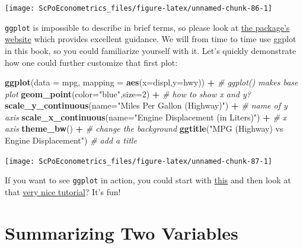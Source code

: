\documentclass[]{book}
\newenvironment{Shaded}{\begin{snugshade}}{\end{snugshade}}
\newcommand{\CommentTok}[1]{\textcolor[rgb]{0.56,0.35,0.01}{\textit{#1}}}
\newcommand{\DataTypeTok}[1]{\textcolor[rgb]{0.13,0.29,0.53}{#1}}
\newcommand{\DecValTok}[1]{\textcolor[rgb]{0.00,0.00,0.81}{#1}}
\newcommand{\KeywordTok}[1]{\textcolor[rgb]{0.13,0.29,0.53}{\textbf{#1}}}
\newcommand{\NormalTok}[1]{#1}
\newcommand{\OperatorTok}[1]{\textcolor[rgb]{0.81,0.36,0.00}{\textbf{#1}}}
\newcommand{\StringTok}[1]{\textcolor[rgb]{0.31,0.60,0.02}{#1}}
\begin{document}
\begin{center}\texttt{[image: ScPoEconometrics\_files/figure-latex/unnamed-chunk-86-1]} \end{center}

\texttt{ggplot} is impossible to describe in brief terms, so please look at \href{http://ggplot2.tidyverse.org}{the package's website} which provides excellent guidance. We will from time to time use ggplot in this book, so you could familiarize yourself with it. Let's quickly demonstrate how one could further customize that first plot:

\begin{Shaded}
\begin{Highlighting}[]
\KeywordTok{ggplot}\NormalTok{(}\DataTypeTok{data =}\NormalTok{ mpg, }\DataTypeTok{mapping =} \KeywordTok{aes}\NormalTok{(}\DataTypeTok{x=}\NormalTok{displ,}\DataTypeTok{y=}\NormalTok{hwy)) }\OperatorTok{+}\StringTok{   }\CommentTok{# ggplot() makes base plot}
\StringTok{  }\KeywordTok{geom_point}\NormalTok{(}\DataTypeTok{color=}\StringTok{"blue"}\NormalTok{,}\DataTypeTok{size=}\DecValTok{2}\NormalTok{) }\OperatorTok{+}\StringTok{     }\CommentTok{# how to show x and y?}
\StringTok{  }\KeywordTok{scale_y_continuous}\NormalTok{(}\DataTypeTok{name=}\StringTok{"Miles Per Gallon (Highway)"}\NormalTok{) }\OperatorTok{+}\StringTok{  }\CommentTok{# name of y axis}
\StringTok{  }\KeywordTok{scale_x_continuous}\NormalTok{(}\DataTypeTok{name=}\StringTok{"Engine Displacement (in Liters)"}\NormalTok{) }\OperatorTok{+}\StringTok{ }\CommentTok{# x axis}
\StringTok{  }\KeywordTok{theme_bw}\NormalTok{() }\OperatorTok{+}\StringTok{    }\CommentTok{# change the background}
\StringTok{  }\KeywordTok{ggtitle}\NormalTok{(}\StringTok{"MPG (Highway) vs Engine Displacement"}\NormalTok{)   }\CommentTok{# add a title}
\end{Highlighting}
\end{Shaded}

\begin{center}\texttt{[image: ScPoEconometrics\_files/figure-latex/unnamed-chunk-87-1]} \end{center}

If you want to see \texttt{ggplot} in action, you could start with \href{http://jcyhong.github.io/ggplot_demo.html}{this} and then look at that \href{https://tutorials.iq.harvard.edu/R/Rgraphics/Rgraphics.html}{very nice tutorial}? It's fun!

\hypertarget{summarize-two}{%
\section{Summarizing Two Variables}\label{summarize-two}}
\end{document}
